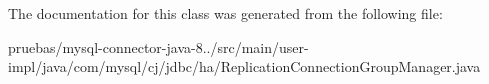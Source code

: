 The documentation for this class was generated from the following file\+:\begin{DoxyCompactItemize}
\item 
pruebas/mysql-\/connector-\/java-\/8../src/main/user-\/impl/java/com/mysql/cj/jdbc/ha/Replication\+Connection\+Group\+Manager.\+java\end{DoxyCompactItemize}
